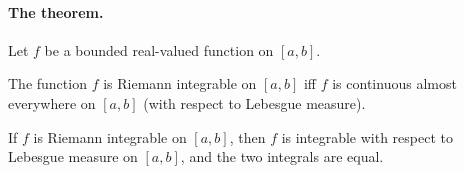 \documentclass{article} %
\begin{document}
\paragraph{The theorem.}

\begin{theorem}
Let $f$ be a bounded real-valued function on $[a,b]$.	
\begin{alphabate}
\item The function $f$ is Riemann integrable on $[a,b]$ iff $f$ is continuous almost everywhere on $[a,b]$ (with respect to Lebesgue measure).
\item If $f$ is Riemann integrable on $[a,b]$, then $f$ is integrable with respect to Lebesgue measure on $[a,b]$, and the two integrals are equal.	
\end{alphabate}
\label{thm:relating_lebesgue_and_riemann_integrals}
\end{theorem}
\end{document}
